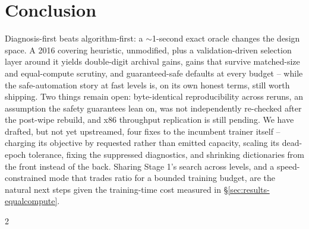 \documentclass[12pt]{article}
\begin{document}
\section{Conclusion}
\label{sec:conclusion}

Diagnosis-first beats algorithm-first: a $\sim$1-second exact oracle
changes the design space. A 2016 covering heuristic, unmodified, plus a
validation-driven selection layer around it yields double-digit
archival gains, gains that survive matched-size and equal-compute
scrutiny, and guaranteed-safe defaults at every budget -- while the
safe-automation story at fast levels is, on its own honest terms, still
worth shipping. Two things remain open: byte-identical reproducibility
across reruns, an assumption the safety guarantees lean on, was not
independently re-checked after the post-wipe rebuild, and x86 throughput
replication is still pending. We have drafted, but not yet upstreamed,
four fixes to the incumbent trainer itself -- charging its objective by
requested rather than emitted capacity, scaling its dead-epoch
tolerance, fixing the suppressed diagnostics, and shrinking dictionaries
from the front instead of the back. Sharing Stage 1's search across
levels, and a speed-constrained mode that trades ratio for a bounded
training budget, are the natural next steps given the training-time
cost measured in \S\ref{sec:results-equalcompute}.

{\footnotesize
\begin{multicols}{2}


\end{multicols}
}
\end{document}
